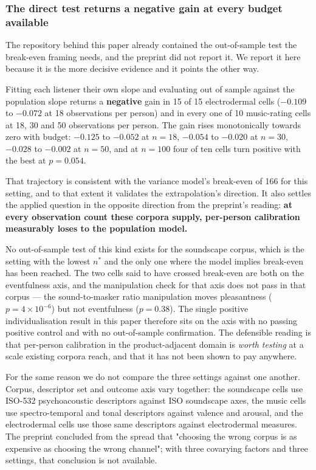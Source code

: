\subsubsection{The direct test returns a negative gain at every budget
available}

The repository behind this paper already contained the out-of-sample test the
break-even framing needs, and the preprint did not report it. We report it
here because it is the more decisive evidence and it points the other way.

Fitting each listener their own slope and evaluating out of sample against the
population slope returns a \textbf{negative} gain in 15 of 15 electrodermal
cells ($-0.109$ to $-0.072$ at 18 observations per person) and in every one of
10 music-rating cells at 18, 30 and 50 observations per person. The gain rises
monotonically towards zero with budget: $-0.125$ to $-0.052$ at $n = 18$,
$-0.054$ to $-0.020$ at $n = 30$, $-0.028$ to $-0.002$ at $n = 50$, and at
$n = 100$ four of ten cells turn positive with the best at $p = 0.054$.

That trajectory is consistent with the variance model's break-even of 166 for
this setting, and to that extent it validates the extrapolation's direction.
It also settles the applied question in the opposite direction from the
preprint's reading: \textbf{at every observation count these corpora supply,
per-person calibration measurably loses to the population model.}

No out-of-sample test of this kind exists for the soundscape corpus, which is
the setting with the lowest $n^{*}$ and the only one where the model implies
break-even has been reached. The two cells said to have crossed break-even are
both on the eventfulness axis, and the manipulation check for that axis does
not pass in that corpus --- the sound-to-masker ratio manipulation moves
pleasantness ($p = 4 \times 10^{-6}$) but not eventfulness ($p = 0.38$). The
single positive individualisation result in this paper therefore sits on the
axis with no passing positive control and with no out-of-sample confirmation.
The defensible reading is that per-person calibration in the
product-adjacent domain is \emph{worth testing} at a scale existing corpora
reach, and that it has not been shown to pay anywhere.

For the same reason we do not compare the three settings against one another.
Corpus, descriptor set and outcome axis vary together: the soundscape cells
use ISO-532 psychoacoustic descriptors against ISO soundscape axes, the music
cells use spectro-temporal and tonal descriptors against valence and arousal,
and the electrodermal cells use those same descriptors against electrodermal
measures. The preprint concluded from the spread that "choosing the wrong
corpus is as expensive as choosing the wrong channel"; with three covarying
factors and three settings, that conclusion is not available.

